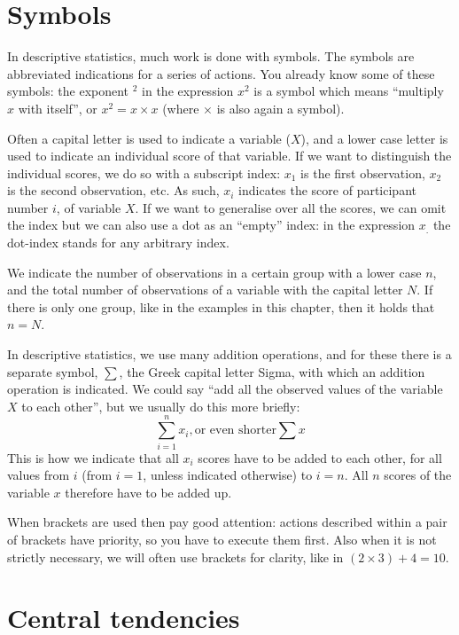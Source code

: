 \documentclass[
]{book}
\begin{document}
\hypertarget{symbols}{%
\section{Symbols}\label{symbols}}

In descriptive statistics, much work is done with symbols. The
symbols are abbreviated indications for a series of actions.
You already know some of these symbols: the exponent \({}^2\) in the expression
\(x^2\) is a symbol which means ``multiply \(x\)
with itself'', or \(x^2 = x \times x\) (where \(\times\) is also again
a symbol).

Often a capital letter is used to indicate a variable (\(X\)),
and a lower case letter is used to indicate an individual score
of that variable. If we want to distinguish the individual
scores, we do so with a subscript index: \(x_1\) is the
first observation, \(x_2\) is the second observation, etc. As such,
\(x_i\) indicates the score of participant number
\(i\), of variable \(X\). If we want to generalise
over all the scores, we can omit the index but
we can also use a dot as an ``empty'' index: in
the expression \(x_.\) the dot-index stands
for any arbitrary index.

We indicate the number of observations in a certain group with a
lower case \(n\), and the total number of observations of a variable
with the capital letter \(N\). If there is only one group, like in
the examples in this chapter, then it holds that \(n=N\).

In descriptive statistics, we use many addition operations, and for these
there is a separate symbol, \(\sum\), the Greek capital letter Sigma,
with which an addition operation is indicated. We could say ``add all the observed
values of the variable \(X\) to each other'', but we usually do this
more briefly:
\[\sum\limits_{i=1}^n x_i, \textrm{or even shorter} \sum x
\]
This is how
we indicate that all \(x_i\) scores have to be added to each other,
for all values from \(i\) (from \(i=1\), unless indicated
otherwise) to \(i=n\). All \(n\) scores of the variable \(x\)
therefore have to be added up.

When brackets are used then pay good attention: actions described
within a pair of brackets have priority, so you have to execute
them first. Also when it is not strictly necessary, we will often use
brackets for clarity, like in \((2\times3)+4=10\).

\hypertarget{central-tendencies}{%
\section{Central tendencies}\label{central-tendencies}}
\end{document}
